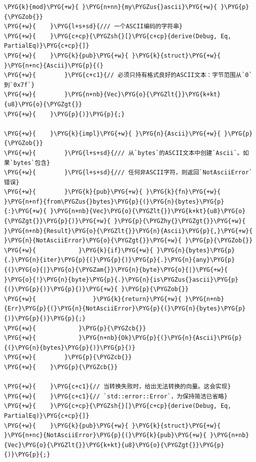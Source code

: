 \begin{Verbatim}[commandchars=\\\{\},breaklines=true,breakanywhere=true,fontsize=\codefont,xleftmargin=17bp]
\PYG{k}{mod}\PYG{+w}{ }\PYG{n+nn}{my\PYGZus{}ascii}\PYG{+w}{ }\PYG{p}{\PYGZob{}}
\PYG{+w}{    }\PYG{l+s+sd}{/// 一个ASCII编码的字符串}
\PYG{+w}{    }\PYG{c+cp}{\PYGZsh{}[}\PYG{c+cp}{derive(Debug, Eq, PartialEq)}\PYG{c+cp}{]}
\PYG{+w}{    }\PYG{k}{pub}\PYG{+w}{ }\PYG{k}{struct}\PYG{+w}{ }\PYG{n+nc}{Ascii}\PYG{p}{(}
\PYG{+w}{        }\PYG{c+c1}{// 必须只持有格式良好的ASCII文本：字节范围从`0`到`0x7f`}
\PYG{+w}{        }\PYG{n+nb}{Vec}\PYG{o}{\PYGZlt{}}\PYG{k+kt}{u8}\PYG{o}{\PYGZgt{}}
\PYG{+w}{    }\PYG{p}{)}\PYG{p}{;}

\PYG{+w}{    }\PYG{k}{impl}\PYG{+w}{ }\PYG{n}{Ascii}\PYG{+w}{ }\PYG{p}{\PYGZob{}}
\PYG{+w}{        }\PYG{l+s+sd}{/// 从`bytes`的ASCII文本中创建`Ascii`。如果`bytes`包含}
\PYG{+w}{        }\PYG{l+s+sd}{/// 任何非ASCII字符，则返回`NotAsciiError`错误}
\PYG{+w}{        }\PYG{k}{pub}\PYG{+w}{ }\PYG{k}{fn}\PYG{+w}{ }\PYG{n+nf}{from\PYGZus{}bytes}\PYG{p}{(}\PYG{n}{bytes}\PYG{p}{:}\PYG{+w}{ }\PYG{n+nb}{Vec}\PYG{o}{\PYGZlt{}}\PYG{k+kt}{u8}\PYG{o}{\PYGZgt{}}\PYG{p}{)}\PYG{+w}{ }\PYG{p}{\PYGZhy{}\PYGZgt{}}\PYG{+w}{ }\PYG{n+nb}{Result}\PYG{o}{\PYGZlt{}}\PYG{n}{Ascii}\PYG{p}{,}\PYG{+w}{ }\PYG{n}{NotAsciiError}\PYG{o}{\PYGZgt{}}\PYG{+w}{ }\PYG{p}{\PYGZob{}}
\PYG{+w}{            }\PYG{k}{if}\PYG{+w}{ }\PYG{n}{bytes}\PYG{p}{.}\PYG{n}{iter}\PYG{p}{(}\PYG{p}{)}\PYG{p}{.}\PYG{n}{any}\PYG{p}{(}\PYG{o}{|}\PYG{o}{\PYGZam{}}\PYG{n}{byte}\PYG{o}{|}\PYG{+w}{ }\PYG{o}{!}\PYG{n}{byte}\PYG{p}{.}\PYG{n}{is\PYGZus{}ascii}\PYG{p}{(}\PYG{p}{)}\PYG{p}{)}\PYG{+w}{ }\PYG{p}{\PYGZob{}}
\PYG{+w}{                }\PYG{k}{return}\PYG{+w}{ }\PYG{n+nb}{Err}\PYG{p}{(}\PYG{n}{NotAsciiError}\PYG{p}{(}\PYG{n}{bytes}\PYG{p}{)}\PYG{p}{)}\PYG{p}{;}
\PYG{+w}{            }\PYG{p}{\PYGZcb{}}
\PYG{+w}{            }\PYG{n+nb}{Ok}\PYG{p}{(}\PYG{n}{Ascii}\PYG{p}{(}\PYG{n}{bytes}\PYG{p}{)}\PYG{p}{)}
\PYG{+w}{        }\PYG{p}{\PYGZcb{}}
\PYG{+w}{    }\PYG{p}{\PYGZcb{}}

\PYG{+w}{    }\PYG{c+c1}{// 当转换失败时，给出无法转换的向量。这会实现}
\PYG{+w}{    }\PYG{c+c1}{// `std::error::Error`，为保持简洁已省略}
\PYG{+w}{    }\PYG{c+cp}{\PYGZsh{}[}\PYG{c+cp}{derive(Debug, Eq, PartialEq)}\PYG{c+cp}{]}
\PYG{+w}{    }\PYG{k}{pub}\PYG{+w}{ }\PYG{k}{struct}\PYG{+w}{ }\PYG{n+nc}{NotAsciiError}\PYG{p}{(}\PYG{k}{pub}\PYG{+w}{ }\PYG{n+nb}{Vec}\PYG{o}{\PYGZlt{}}\PYG{k+kt}{u8}\PYG{o}{\PYGZgt{}}\PYG{p}{)}\PYG{p}{;}


\end{Verbatim}
